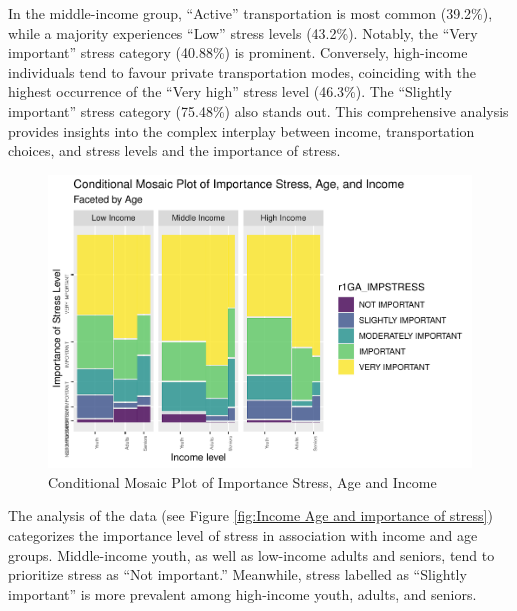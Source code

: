 \documentclass[
11pt, %
oneside, %
english, %
singlespacing, %
]{macthesis} %
\begin{document}
In the middle-income group, ``Active'' transportation is most common (39.2\%), while a majority experiences ``Low'' stress levels (43.2\%). Notably, the ``Very important'' stress category (40.88\%) is prominent. Conversely, high-income individuals tend to favour private transportation modes, coinciding with the highest occurrence of the ``Very high'' stress level (46.3\%). The ``Slightly important'' stress category (75.48\%) also stands out. This comprehensive analysis provides insights into the complex interplay between income, transportation choices, and stress levels and the importance of stress.
\begin{figure}
\includegraphics[width=0.85\linewidth]{thesis_files/figure-latex/unnamed-chunk-31-1} \caption{\label{fig:Income Age and importance of stress}Conditional Mosaic Plot of Importance Stress, Age and Income}\label{fig:unnamed-chunk-31}
\end{figure}
The analysis of the data (see Figure \ref{fig:Income Age and importance of stress}) categorizes the importance level of stress in association with income and age groups. Middle-income youth, as well as low-income adults and seniors, tend to prioritize stress as ``Not important.'' Meanwhile, stress labelled as ``Slightly important'' is more prevalent among high-income youth, adults, and seniors.
\end{document}
